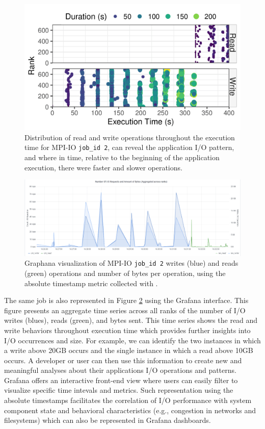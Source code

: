 \begin{figure}
	\centering
	\includegraphics[width=\linewidth]{figs/255653_mpi_io_luster_no_coll_execution2.png}
	\caption{Distribution of read and write operations
          throughout the execution time for MPI-IO \texttt{job\_id 2},
          can reveal the application I/O pattern, and where in time, relative to the beginning
of the application execution,
          there were faster and slower operations.}
	\label{f:mpi_io}
\end{figure}
\begin{figure}
	\centering
	\includegraphics[width=\textwidth]{figs/255653_mpi_io_luster_no_coll.png}
	\caption{Graphana visualization of MPI-IO \texttt{job\_id 2}
          writes (blue) and reads (green) operations and number of bytes per
          operation, using the absolute timestamp metric collected
	  with \Darshan{}.}
	  \label{f:mpi_io_grafana}
\end{figure}

The same job is also represented in Figure \ref{f:mpi_io_grafana}
using the Grafana interface. This figure presents an aggregate time
series across all ranks of the number of I/O
writes (blues), reads (green), and bytes sent.
This time series shows the read and write behaviors throughout execution 
time which provides further insights into I/O occurrences and size. For 
example, we can identify the two instances in which a write above 20GB 
occurs and the single instance in which a read above 10GB occurs. A developer 
or user can then use this information to create new and meaningful analyses 
about their applications I/O operations and patterns. Grafana offers an 
interactive front-end view where users can easily filter to visualize 
specific time intevals and metrics. Such representation using the absolute timestamps
facilitates the correlation of I/O performance with system component state
and behavioral characteristics (e.g., congestion in networks and filesystems)
which can also be represented in Grafana dashboards.


